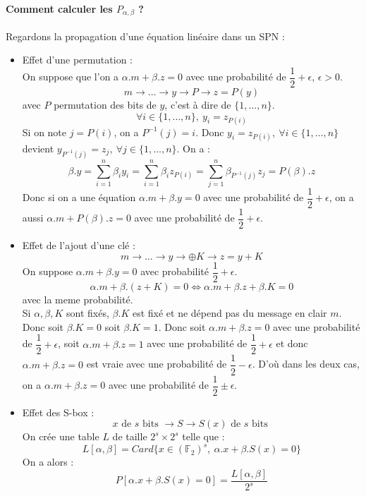 \documentclass[12pt,a4paper]{report}
\begin{document}
\paragraph{Comment calculer les $P_{\alpha,\beta}$ ?\\}
Regardons la propagation d'une équation linéaire dans un SPN :
\begin{itemize}
\item Effet d'une permutation :\\
On suppose que l'on a $\alpha.m + \beta.z = 0$ avec une probabilité de $\dfrac{1}{2} + \epsilon$, $\epsilon > 0$.
$$ m \rightarrow \ldots \rightarrow y \rightarrow P \rightarrow z=P(y) $$
avec $P$ permutation des bits de $y$, c'est à dire de $\{1,\ldots,n\}$. 
$$\forall i \in \{1,\ldots,n\},\ y_i=z_{P(i)} $$
Si on note $j=P(i)$, on a $P^{-1}(j)=i$. Donc $y_i = z_{P(i)},\ \forall i \in \{1,\ldots,n\}$ devient $ y_{P^{-1}(j)}=z_j,\ \forall j \in \{1,\ldots,n\}$. On a :
$$ \beta.y = \sum_{i=1}^n \beta_i y_i = \sum_{i=1}^n \beta_i z_{P(i)} = \sum_{j=1}^n \beta_{P^{-1}(j)}z_j = P(\beta).z $$
Donc si on a une équation $\alpha.m + \beta.y = 0$ avec une probabilité de $\dfrac{1}{2} + \epsilon$, on a aussi $\alpha.m+P(\beta).z = 0$ avec une probabilité de $\dfrac{1}{2} + \epsilon$.
\item Effet de l'ajout d'une clé :\\
$$ m \rightarrow \ldots \rightarrow y \rightarrow \oplus K \rightarrow z = y + K $$
On suppose $\alpha.m + \beta.y = 0$ avec probabilité $\dfrac{1}{2} + \epsilon$.
$$ \alpha.m + \beta.(z+K) = 0 \Leftrightarrow \alpha.m + \beta.z + \beta.K = 0 $$ 
avec la meme probabilité. \\
Si $\alpha,\beta,K$ sont fixés, $\beta.K$ est fixé et ne dépend pas du message en clair $m$. Donc soit $\beta.K = 0$ soit $\beta.K = 1$. 
Donc soit $\alpha.m + \beta.z = 0$ avec une probabilité de $\dfrac{1}{2} + \epsilon$, soit $\alpha.m + \beta.z = 1$ avec une probabilité de $\dfrac{1}{2} + \epsilon$ et donc $\alpha.m + \beta.z = 0$ est vraie avec une probabilité de $\dfrac{1}{2} - \epsilon $. D'où dans les deux  cas, on a $\alpha.m + \beta.z = 0$ avec une probabilité de $\dfrac{1}{2} \pm \epsilon $.
\item Effet des S-box :\\
$$ x \mbox{ de } s \mbox{ bits } \rightarrow S \rightarrow S(x) \mbox{ de } s \mbox{ bits } $$
On crée une table $L$ de taille $2^s\times 2^s$ telle que :
$$ L[\alpha,\beta] = Card\{x \in (\mathbb{F}_2)^s,\ \alpha.x+\beta.S(x) = 0 \}$$
On a alors :
$$ P[\alpha.x+\beta.S(x) = 0] = \frac{L[\alpha,\beta]}{2^s} $$

\end{itemize}
\end{document}
